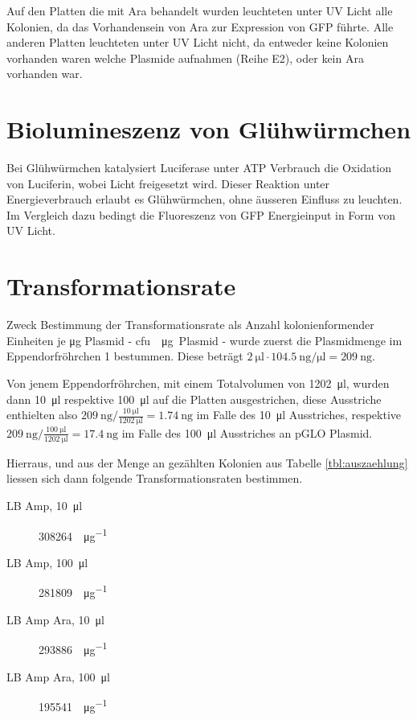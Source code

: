 \documentclass[a4paper,english]{scrreprt}
\begin{document}
Auf den Platten die mit Ara behandelt wurden leuchteten unter UV Licht alle
Kolonien, da das Vorhandensein von Ara zur Expression von GFP führte. Alle
anderen Platten leuchteten unter UV Licht nicht, da entweder keine Kolonien
vorhanden waren welche Plasmide aufnahmen (Reihe E2), oder kein Ara vorhanden
war.

\section{Biolumineszenz von Glühwürmchen}

Bei Glühwürmchen katalysiert Luciferase unter ATP Verbrauch die Oxidation von
Luciferin, wobei Licht freigesetzt wird. Dieser Reaktion unter Energieverbrauch
erlaubt es Glühwürmchen, ohne äusseren Einfluss zu leuchten.  Im Vergleich dazu
bedingt die Fluoreszenz von GFP Energieinput in Form von UV Licht.

\section{Transformationsrate}

Zweck Bestimmung der Transformationsrate als Anzahl kolonienformender Einheiten
je \si{\ug} Plasmid - \si{cfu \per \ug Plasmid} - wurde zuerst die Plasmidmenge
im Eppendorfröhrchen 1 bestummen. Diese beträgt $\SI{2}{\ul} \cdot
\SI{104.5}{\ng \per \ul} = \SI{209}{\ng}$.

Von jenem Eppendorfröhrchen, mit einem Totalvolumen von \SI{1202}{\ul}, wurden
dann \SI{10}{\ul} respektive \SI{100}{\ul} auf die Platten ausgestrichen, diese
Ausstriche enthielten also $\SI{209}{\ng} / \frac{\SI{10}{\ul}}{\SI{1202}{\ul}} =
\SI{1.74}{\ng}$ im Falle des \SI{10}{\ul} Ausstriches, respektive
$\SI{209}{\ng} / \frac{\SI{100}{\ul}}{\SI{1202}{\ul}} = \SI{17.4}{\ng}$ im Falle des
\SI{100}{\ul} Ausstriches an pGLO Plasmid.

Hierraus, und aus der Menge an gezählten Kolonien aus Tabelle
\ref{tbl:auszaehlung} liessen sich dann folgende Transformationsraten
bestimmen.

\begin{description}
	\item[LB Amp, \SI{10}{\ul}] \SI{308264}{\cfu \per \ug {}}
	\item[LB Amp, \SI{100}{\ul}] \SI{281809}{\cfu \per \ug {}}
	\item[LB Amp Ara, \SI{10}{\ul}] \SI{293886}{\cfu \per \ug {}}
	\item[LB Amp Ara, \SI{100}{\ul}] \SI{195541}{\cfu \per \ug {}}
\end{description}
\end{document}
